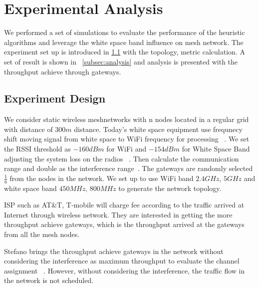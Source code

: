 \section{Experimental Analysis}
\label{sec:experimentdesign}

We performed a set of simulations to evaluate the performance of the heuristic algorithms and leverage the white space band influence on mesh network. 
The experiment set up is introduced in \ref{subsec:design} with the topology, metric calculation.
A set of result is shown in ~\ref{subsec:analysis} and analysis is presented with the throughput achieve through gateways.

\subsection{Experiment Design}
\label{subsec:design}
We consider static wireless meshnetworks with n nodes located in a regular grid with distance of $300m$ distance. 
Today's white space equipment use frequnecy shift moving signal from white space to WiFi frequency for processing ~\cite{Ubnt}.
We set the RSSI threshold as $-160dBm$ for WiFi and $-154dBm$ for White Space Band adjusting the system loss on the radios ~\cite{cui2013leveraging}.
Then calculate the communication range and double as the interference range~\cite{raniwala2005architecture}. The gateways are randomly selected $\frac{1}{6}$ from the nodes in the network.
We set up to use WiFi band $2.4 GHz$, $5 GHz$ and white space band $450 MHz$, $800 MHz$ to generate the network topology.

ISP such as AT\&T, T-mobile will charge fee according to the traffic arrived at Internet through wireless network. 
They are interested in getting the more throughput achieve gateways, which is the throughput arrived at the gateways from all the mesh nodes. 

Stefano brings the throughput achieve gateways in the network without considering the interference as maximum throughput to evaluate the channel assignment ~\cite{avallone2008channel}. 
However, without considering the interference, the traffic flow in the network is not scheduled.

